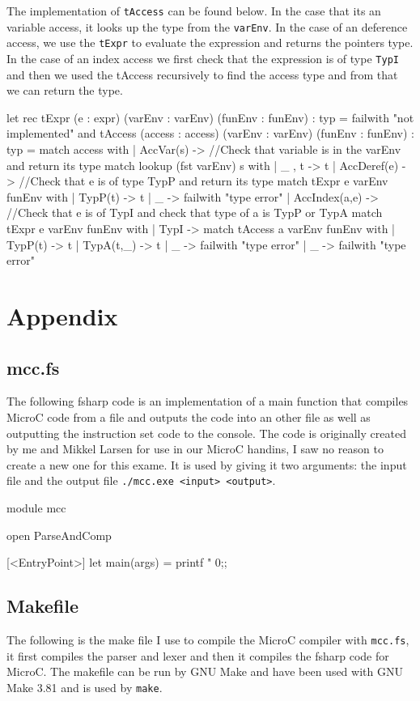 The implementation of \texttt{tAccess} can be found below. In the case that its
an variable access, it looks up the type from the \texttt{varEnv}. In the case
of an deference access, we use the \texttt{tExpr} to evaluate the expression and returns
the pointers type. In the case of an index access we first check that the
expression is of type \texttt{TypI} and then we used the tAccess recursively to
find the access type and from that we can return the type.
\begin{fs}
let rec tExpr (e : expr) (varEnv : varEnv) (funEnv : funEnv) : typ =
    failwith "not implemented"
and tAccess (access : access) (varEnv : varEnv) (funEnv : funEnv) : typ =
    match access with
    | AccVar(s) -> 
      //Check that variable is in the varEnv and return its type
      match lookup (fst varEnv) s with
      | _ , t -> t
    | AccDeref(e) -> 
      //Check that e is of type TypP and return its type
      match tExpr e varEnv funEnv with
      | TypP(t) -> t
      | _ -> failwith "type error"
    | AccIndex(a,e) -> 
      //Check that e is of TypI and check that type of a is TypP or TypA
      match tExpr e varEnv funEnv with
      | TypI -> 
        match tAccess a varEnv funEnv with
        | TypP(t) -> t
        | TypA(t,_) -> t
        | _ -> failwith "type error"
      | _ -> failwith "type error"
\end{fs}

\pagebreak
\section{Appendix}
\subsection{mcc.fs}
The following fsharp code is an implementation of a main function that compiles
MicroC code from a file and outputs the code into an other file as well as
outputting the instruction set code to the console. The code is originally
created by me and Mikkel Larsen for use in our MicroC handins, I saw no reason
to create a new one for this exame. It is used by giving it two arguments: the
input file and the output file \texttt{./mcc.exe <input> <output>}. 
\begin{fs}
module mcc

open ParseAndComp

[<EntryPoint>]
let main(args) =
    printf "%
    0;;
\end{fs}
\subsection{Makefile}
The following is the make file I use to compile the MicroC compiler with
\texttt{mcc.fs}, it first compiles the parser and lexer and then it compiles the
fsharp code for MicroC.  The makefile can be run by GNU Make and have been used
with GNU Make 3.81 and is used by \texttt{make}.

